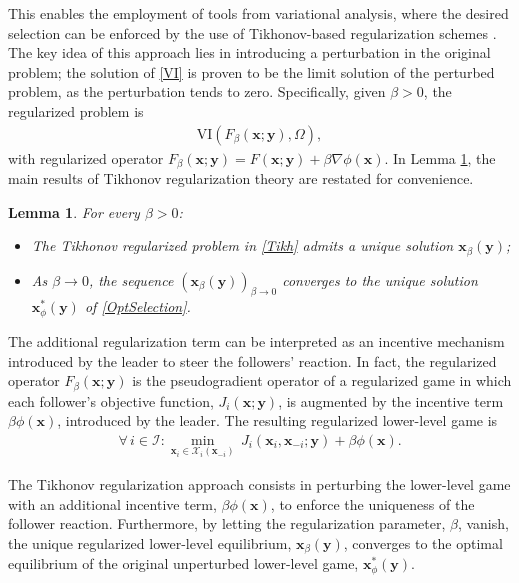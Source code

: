 \documentclass[letterpaper, 10 pt, conference]{ieeeconf}
\newcommand\xbf{\mathbf{x}}
\newcommand\ybf{\mathbf{y}}
\newtheorem{lemma}{Lemma}
\begin{document}
This enables the employment of tools from variational analysis, where the desired selection can be enforced by the use of Tikhonov-based regularization schemes \cite{facchinei2003finite}. The key idea of this approach lies in introducing a perturbation in the original problem; the solution of \eqref{VI} is proven to be the limit solution of the perturbed problem, as the perturbation tends to zero. Specifically, given $\beta >0$, the regularized problem is 
    \begin{align}\label{Tikh}
        \mathrm{VI}(F_\beta(\xbf;\ybf), \Omega),
    \end{align}
with regularized operator $F_\beta( \xbf; \ybf)=F(\xbf;\ybf)+\beta \nabla \phi(\xbf)$. 
In Lemma \ref{SERVEORA}, the main results of Tikhonov regularization theory are restated \cite[Theorem 12.2.5]{facchinei2003finite} for convenience.
\begin{lemma}\label{SERVEORA}
    For every $\beta >0$:
    \begin{itemize}
        \item The Tikhonov regularized problem in \eqref{Tikh} admits a unique solution $\xbf_\beta(\ybf)$;
        \item As $\beta \rightarrow 0$, the sequence $\left(\xbf_\beta(\ybf)\right)_{\beta\rightarrow 0}$ converges to the unique solution $\xbf^*_\phi(\ybf)$ of \eqref{OptSelection}. 
    \end{itemize}
\end{lemma}
The additional regularization term can be interpreted as an incentive mechanism introduced by the leader to steer the followers' reaction. In fact, the regularized operator $F_\beta(\xbf;\ybf)$ is the pseudogradient operator of a regularized game in which each follower’s objective function, $J_i(\xbf; \ybf)$, is augmented by the incentive term $\beta \phi(\xbf)$, introduced by the leader. The resulting regularized lower-level game is
\begin{align}\label{betaFollowers}
\forall \,i \in \mathcal{I}: \underset{\xbf_i \in \mathcal{X}_i(\xbf_{-i})} {\min} \, J_i(\xbf_i, \xbf_{-i}; \ybf)+\beta\phi(\xbf).
\end{align}

The Tikhonov regularization approach consists in perturbing the lower-level game with an additional incentive term, $\beta \phi(\xbf)$, to enforce the uniqueness of the follower reaction. Furthermore, by letting the regularization parameter, $\beta$, vanish, the unique regularized lower-level equilibrium, $\xbf_\beta(\ybf)$, converges to the optimal equilibrium of the original unperturbed lower-level game, $\xbf^*_\phi(\ybf)$. 
\end{document}
